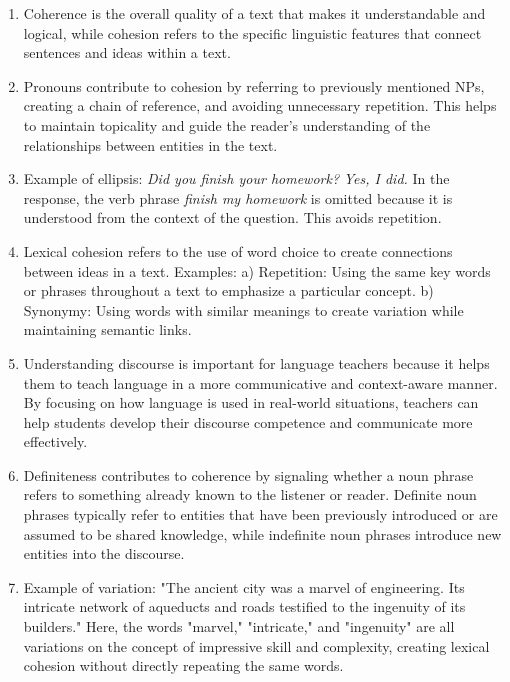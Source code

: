 \begin{tcolorbox}[title=Answer Key 1--7, colback=white, colframe=blue!75!black, fonttitle=\bfseries]

\begin{enumerate}[noitemsep]
    \item Coherence is the overall quality of a text that makes it understandable and logical, while cohesion refers to the specific linguistic features that connect sentences and ideas within a text.
    \item Pronouns contribute to cohesion by referring to previously mentioned NPs, creating a chain of reference, and avoiding unnecessary repetition. This helps to maintain topicality and guide the reader's understanding of the relationships between entities in the text.
    \item Example of ellipsis: \textit{Did you finish your homework?} \textit{Yes, I did.} In the response, the verb phrase \textit{finish my homework} is omitted because it is understood from the context of the question. This avoids repetition.
    \item Lexical cohesion refers to the use of word choice to create connections between ideas in a text. Examples: a) Repetition: Using the same key words or phrases throughout a text to emphasize a particular concept. b) Synonymy: Using words with similar meanings to create variation while maintaining semantic links.
    \item Understanding discourse is important for language teachers because it helps them to teach language in a more communicative and context-aware manner. By focusing on how language is used in real-world situations, teachers can help students develop their discourse competence and communicate more effectively.
    \item Definiteness contributes to coherence by signaling whether a noun phrase refers to something already known to the listener or reader. Definite noun phrases typically refer to entities that have been previously introduced or are assumed to be shared knowledge, while indefinite noun phrases introduce new entities into the discourse.
    \item Example of variation: "The ancient city was a marvel of engineering. Its intricate network of aqueducts and roads testified to the ingenuity of its builders." Here, the words "marvel," "intricate," and "ingenuity" are all variations on the concept of impressive skill and complexity, creating lexical cohesion without directly repeating the same words.
\end{enumerate}
\end{tcolorbox}

